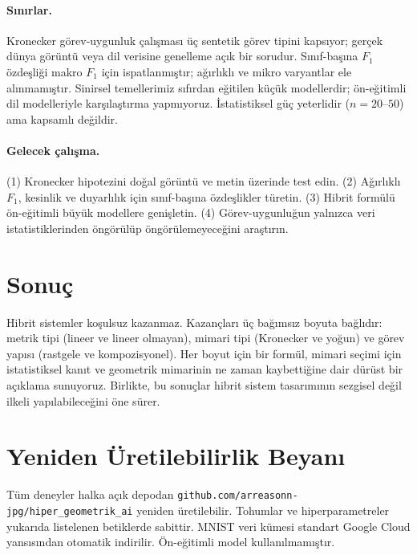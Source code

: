 \documentclass[11pt,a4paper]{article}
\begin{document}
\paragraph{Sınırlar.}
Kronecker görev-uygunluk çalışması üç sentetik görev tipini kapsıyor;
gerçek dünya görüntü veya dil verisine genelleme açık bir sorudur.
Sınıf-başına $F_1$ özdeşliği makro $F_1$ için ispatlanmıştır; ağırlıklı
ve mikro varyantlar ele alınmamıştır. Sinirsel temellerimiz sıfırdan
eğitilen küçük modellerdir; ön-eğitimli dil modelleriyle karşılaştırma
yapmıyoruz. İstatistiksel güç yeterlidir ($n = 20$--$50$) ama kapsamlı
değildir.

\paragraph{Gelecek çalışma.}
(1) Kronecker hipotezini doğal görüntü ve metin üzerinde test edin.
(2) Ağırlıklı $F_1$, kesinlik ve duyarlılık için sınıf-başına özdeşlikler
türetin. (3) Hibrit formülü ön-eğitimli büyük modellere genişletin.
(4) Görev-uygunluğun yalnızca veri istatistiklerinden öngörülüp
öngörülemeyeceğini araştırın.

\section{Sonuç}
\label{sec:conclusion}

Hibrit sistemler koşulsuz kazanmaz. Kazançları üç bağımsız boyuta
bağlıdır: metrik tipi (lineer ve lineer olmayan), mimari tipi (Kronecker
ve yoğun) ve görev yapısı (rastgele ve kompozisyonel). Her boyut için
bir formül, mimari seçimi için istatistiksel kanıt ve geometrik
mimarinin ne zaman kaybettiğine dair dürüst bir açıklama sunuyoruz.
Birlikte, bu sonuçlar hibrit sistem tasarımının sezgisel değil ilkeli
yapılabileceğini öne sürer.

\section*{Yeniden Üretilebilirlik Beyanı}
Tüm deneyler halka açık depodan
\texttt{github.com/arreasonn-jpg/hiper\_geometrik\_ai} yeniden
üretilebilir. Tohumlar ve hiperparametreler yukarıda listelenen
betiklerde sabittir. MNIST veri kümesi standart Google Cloud
yansısından otomatik indirilir. Ön-eğitimli model kullanılmamıştır.
\end{document}
